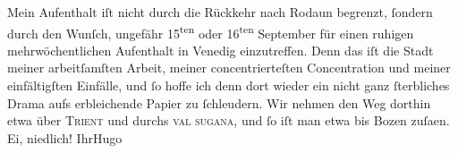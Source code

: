 \pstart
           Mein Aufenthalt iſt nicht durch die Rückkehr nach Rodaun begrenzt,{ }ſondern durch den Wunſch, ungefähr {\pb}15\textsuperscript{ten} oder 16\textsuperscript{ten} September für einen
               ruhigen mehrwöchentlichen Aufenthalt in Venedig
               einzutreffen. Denn das iſt die Stadt meiner arbeitſamſten Arbeit, meiner
               concentrierteſten Concentration und meiner einfältigſten Einfälle, und{ }ſo hoffe ich
               denn dort wieder ein nicht ganz{ }ſterbliches Drama aufs erbleichende Papier zu{ }ſchleudern. Wir nehmen den
               Weg dorthin etwa über \textsc{Trient} und durchs \textsc{val sugana}, und{ }ſo iſt man etwa bis Bozen zuſa{\geminationm}en. Ei, niedlich!\pend
           \pstart Ihr\spacefill\mbox{Hugo}\pend{}\endnumbering{}  \newcommand{\dateiname}{L01431}\newcommand{\titel}{Hugo von Hofmannsthal an Arthur Schnitzler, 21. 8. [1904]}\newcommand{\editorInnen}{Martin Anton Müller und Gerd-Hermann Susen}
